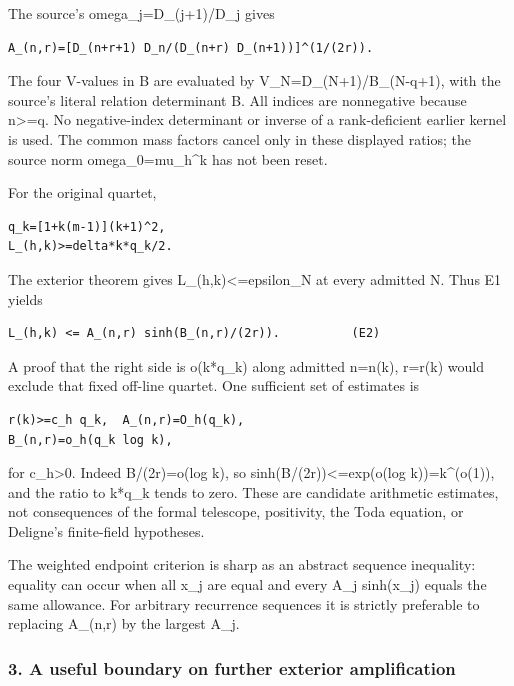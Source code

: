 The source's omega\_j=D\_(j+1)/D\_j gives

\begin{verbatim}
A_(n,r)=[D_(n+r+1) D_n/(D_(n+r) D_(n+1))]^(1/(2r)).
\end{verbatim}

The four V-values in B are evaluated by V\_N=D\_(N+1)/B\_(N-q+1), with the source's literal relation determinant B. All indices are nonnegative because n\textgreater=q. No negative-index determinant or inverse of a rank-deficient earlier kernel is used. The common mass factors cancel only in these displayed ratios; the source norm omega\_0=mu\_h\^{}k has not been reset.

For the original quartet,

\begin{verbatim}
q_k=[1+k(m-1)](k+1)^2,
L_(h,k)>=delta*k*q_k/2.
\end{verbatim}

The exterior theorem gives L\_(h,k)\textless=epsilon\_N at every admitted N. Thus E1 yields

\begin{verbatim}
L_(h,k) <= A_(n,r) sinh(B_(n,r)/(2r)).          (E2)
\end{verbatim}

A proof that the right side is o(k*q\_k) along admitted n=n(k), r=r(k) would exclude that fixed off-line quartet. One sufficient set of estimates is

\begin{verbatim}
r(k)>=c_h q_k,  A_(n,r)=O_h(q_k),
B_(n,r)=o_h(q_k log k),
\end{verbatim}

for c\_h\textgreater0. Indeed B/(2r)=o(log k), so sinh(B/(2r))\textless=exp(o(log k))=k\^{}(o(1)), and the ratio to k*q\_k tends to zero. These are candidate arithmetic estimates, not consequences of the formal telescope, positivity, the Toda equation, or Deligne's finite-field hypotheses.

The weighted endpoint criterion is sharp as an abstract sequence inequality: equality can occur when all x\_j are equal and every A\_j sinh(x\_j) equals the same allowance. For arbitrary recurrence sequences it is strictly preferable to replacing A\_(n,r) by the largest A\_j.

\subsubsection{3. A useful boundary on further exterior amplification}\label{endpoint-pr23_original--a-useful-boundary-on-further-exterior-amplification}

